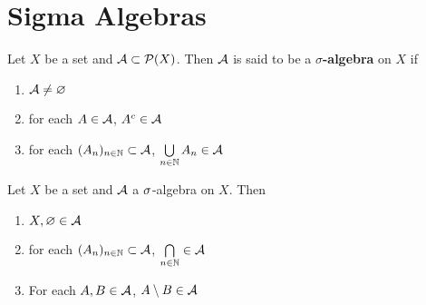 \documentclass{book}
\begin{document}
	
	
	
	
	
	
	
	
	
	
	

	

	









































	\newpage
	\section{Sigma Algebras}
		
	\begin{defn}  
		Let $X$ be a set and $\mathcal{A} \subset \mathcal{P}(X)$. Then $\mathcal{A}$ is said to be a $\sigma$\textbf{-algebra} on $X$ if 
		\begin{enumerate}
			\item $\mathcal{A} \neq \varnothing$
			\item for each $A \in \mathcal{A}$, $A^c \in \mathcal{A}$
			\item for each $(A_n)_{n \in \mathbb{N}} \subset \mathcal{A}$, $\bigcup\limits_{n \in \mathbb{N}}A_n \in \mathcal{A}$
		\end{enumerate}
	\end{defn}
	
	\begin{ex}  
		Let $X$ be a set and $\mathcal{A}$ a $\sigma$-algebra on $X$. Then 
		\begin{enumerate}
			\item $X, \varnothing \in \mathcal{A}$
			\item for each $(A_n)_{n \in \mathbb{N}} \subset \mathcal{A}$, $\bigcap\limits_{n \in \mathbb{N}} \in \mathcal{A}$
			\item For each $A, B \in \mathcal{A}$, $A \setminus B \in \mathcal{A}$  
		\end{enumerate}
	\end{ex}
	
\end{document}
